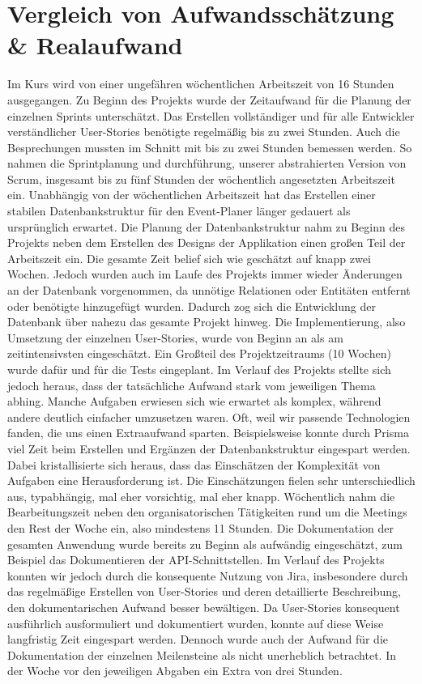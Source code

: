 \documentclass[a4paper,12pt]{article}
\begin{document}

\section{Vergleich von Aufwandsschätzung \& Realaufwand}

Im Kurs wird von einer ungefähren wöchentlichen Arbeitszeit von 16 Stunden ausgegangen.
Zu Beginn des Projekts wurde der Zeitaufwand für die Planung der einzelnen Sprints unterschätzt. Das Erstellen vollständiger und für alle Entwickler verständlicher User-Stories benötigte regelmäßig bis zu zwei Stunden. Auch die Besprechungen mussten im Schnitt mit bis zu zwei Stunden bemessen werden. So nahmen die Sprintplanung und durchführung, unserer abstrahierten Version von Scrum, insgesamt bis zu fünf Stunden der wöchentlich angesetzten Arbeitszeit ein. Unabhängig von der wöchentlichen Arbeitszeit hat das Erstellen einer stabilen Datenbankstruktur für den Event-Planer länger gedauert als ursprünglich erwartet. Die Planung der Datenbankstruktur nahm zu Beginn des Projekts neben dem Erstellen des Designs der Applikation einen großen Teil der Arbeitszeit ein. Die gesamte Zeit belief sich wie geschätzt auf knapp zwei Wochen. Jedoch wurden auch im Laufe des Projekts immer wieder Änderungen an der Datenbank vorgenommen, da unnötige Relationen oder Entitäten entfernt oder benötigte hinzugefügt wurden. Dadurch zog sich die Entwicklung der Datenbank über nahezu das gesamte Projekt hinweg. Die Implementierung, also Umsetzung der einzelnen User-Stories, wurde von Beginn an als am zeitintensivsten eingeschätzt. Ein Großteil des Projektzeitraums (10 Wochen) wurde dafür und für die Tests eingeplant. Im Verlauf des Projekts stellte sich jedoch heraus, dass der tatsächliche Aufwand stark vom jeweiligen Thema abhing. Manche Aufgaben erwiesen sich wie erwartet als komplex, während andere deutlich einfacher umzusetzen waren. Oft, weil wir passende Technologien fanden, die uns einen Extraaufwand sparten. Beispielsweise konnte durch Prisma viel Zeit beim Erstellen und Ergänzen der Datenbankstruktur eingespart werden. Dabei kristallisierte sich heraus, dass das Einschätzen der Komplexität von Aufgaben eine Herausforderung ist. Die Einschätzungen fielen sehr unterschiedlich aus, typabhängig, mal eher vorsichtig, mal eher knapp. Wöchentlich nahm die Bearbeitungszeit neben den organisatorischen Tätigkeiten rund um die Meetings den Rest der Woche ein, also mindestens 11 Stunden. Die Dokumentation der gesamten Anwendung wurde bereits zu Beginn als aufwändig eingeschätzt, zum Beispiel das Dokumentieren der API-Schnittstellen. Im Verlauf des Projekts konnten wir jedoch durch die konsequente Nutzung von Jira, insbesondere durch das regelmäßige Erstellen von User-Stories und deren detaillierte Beschreibung, den dokumentarischen Aufwand besser bewältigen. Da User-Stories konsequent ausführlich ausformuliert und dokumentiert wurden, konnte auf diese Weise langfristig Zeit eingespart werden. Dennoch wurde auch der Aufwand für die Dokumentation der einzelnen Meilensteine als nicht unerheblich betrachtet. In der Woche vor den jeweiligen Abgaben ein Extra von drei Stunden. 
\end{document}
